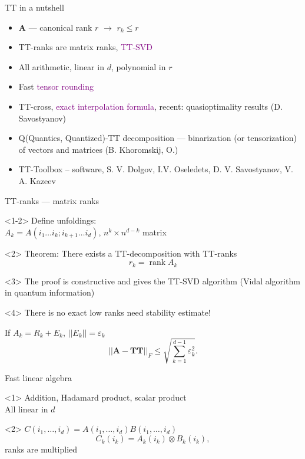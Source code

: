 \documentclass{beamer}[14pt, presentation]
\def\rank{\mathop{\mathrm{rank}}\nolimits}
\begin{document}
\begin{frame}[label=sec-5-2]{TT in a nutshell}
\begin{itemize}
\item $\mathbf{A}$ --- canonical rank $r$ $\rightarrow$ $r_k \leq r$
\item TT-ranks are matrix ranks, \textcolor{purple}{TT-SVD}
\item All arithmetic, linear in $d$, polynomial in $r$
\item Fast \textcolor{purple}{\sc tensor rounding}
\item TT-cross, \textcolor{purple}{exact interpolation formula}, recent:
quasioptimality results (D. Savostyanov)
\item Q(Quantics, Quantized)-TT decomposition --- binarization (or
tensorization) of vectors and matrices (B. Khoromskij, O.)
\item TT-Toolbox -- software, S. V. Dolgov, I.V. Oseledets,
D. V. Savostyanov, V. A. Kazeev
\end{itemize}
\end{frame}

\begin{frame}[label=sec-5-3]{TT-ranks --- matrix ranks}
\begin{onlyenv}<1-2>
Define unfoldings: \\
 $A_k = A(i_1 \ldots i_k; i_{k+1} \ldots i_d)$, $n^k \times n^{d-k}$
matrix
\end{onlyenv}

\begin{onlyenv}<2>
Theorem: There exists a TT-decomposition with TT-ranks
$$r_k = \rank A_k$$
\end{onlyenv}

\begin{onlyenv}<3>
The proof is constructive and gives the TT-SVD algorithm (Vidal
algorithm in quantum information)
\end{onlyenv}

\begin{onlyenv}<4>
There is no exact low ranks need stability estimate! \\
\begin{theorem}
If $A_k = R_k + E_k$, $||E_k|| = \varepsilon_k$
$$||\mathbf{A}-\mathbf{TT}||_F \leq \sqrt{\sum_{k=1}^{d-1} \varepsilon^2_k}.$$
\end{theorem}
\end{onlyenv}
\end{frame}
\begin{frame}[label=sec-5-4]{Fast linear algebra}
\begin{onlyenv}<1>
Addition, Hadamard product, scalar product \\
 All linear in $d$ \\
\end{onlyenv}

\begin{onlyenv}<2>
$C(i_1,\ldots,i_d) = A(i_1,\ldots,i_d) B(i_1,\ldots,i_d)$ \\
   $$C_k(i_k) = A_k(i_k) \otimes B_k(i_k),$$
ranks are multiplied
\end{onlyenv}
\end{frame}
\end{document}
